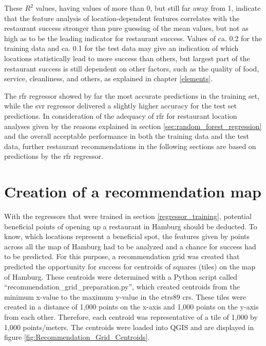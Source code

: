 \documentclass[a4paper, 11pt, oneside]{Thesis}  %
\begin{document}
These $R^2$ values, having values of more than 0, but still far away from 1, indicate that the feature analysis of location-dependent features correlates with the restaurant success stronger than pure guessing of the mean values, but not as high as to be the leading indicator for restaurant success. Values of ca. 0.2 for the training data and ca. 0.1 for the test data may give an indication of which locations statistically lead to more success than others, but largest part of the restaurant success is still dependent on other factors, such as the quality of food, service, cleanliness, and others, as explained in chapter \ref{elements}.

The \ac{rfr} regressor showed by far the most accurate predictions in the training set, while the \ac{svr} regressor delivered a slightly higher accuracy for the test set predictions. In consideration of the adequacy of \ac{rfr} for restaurant location analyses given by the reasons explained in section \ref{sec:random_forest_regression} and the overall acceptable performance in both the training data and the test data, further restaurant recommendations in the following sections are based on predictions by the \ac{rfr} regressor.


\section{Creation of a recommendation map}
\label{creation_of_recommendation_map}

With the regressors that were trained in section \ref{regressor_training}, potential beneficial points of opening up a restaurant in Hamburg should be deducted. To know, which locations represent a beneficial spot, the features given by points across all the map of Hamburg had to be analyzed and a chance for success had to be predicted. For this purpose, a recommendation grid was created that predicted the opportunity for success for centroids of squares (tiles) on the map of Hamburg. These centroids were determined with a Python script called ``recommendation\_grid\_preparation.py'', which created centroids from the minimum x-value to the maximum y-value in the \ac{etrs89} \ac{crs}. These tiles were created in a distance of 1,000 points on the x-axis and 1,000 points on the y-axis from each other. Therefore, each centroid was representative of a tile of 1,000 by 1,000 points/meters. The centroids were loaded into QGIS and are displayed in figure \ref{fig:Recommendation_Grid_Centroids}.
\end{document}
